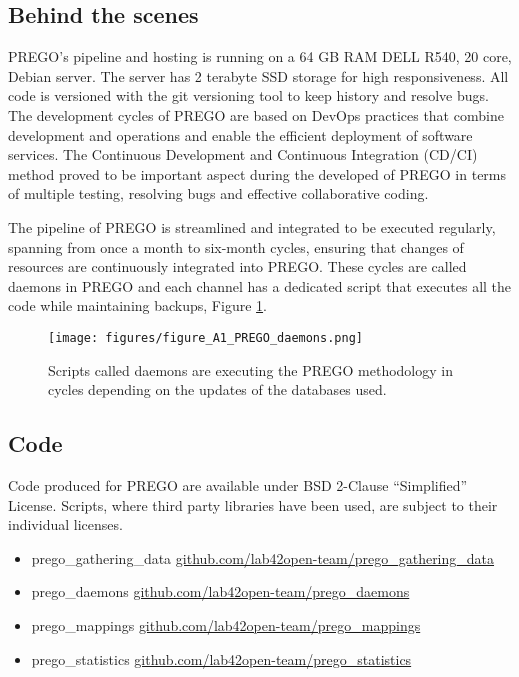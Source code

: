 \subsection{Behind the scenes}
\label{deamons}

PREGO's pipeline and hosting is running on a 64 GB RAM DELL R540, 20 core, Debian server.
The server has 2 terabyte SSD storage for high responsiveness. 
All code is versioned with the git versioning tool to keep history and 
resolve bugs. The development cycles of PREGO are based on DevOps practices that
combine development and operations and enable the efficient deployment of software services.
The Continuous Development and Continuous Integration (CD/CI) method proved to be
important aspect during the developed of PREGO in terms of multiple testing,
resolving bugs and effective collaborative coding. 

The pipeline of PREGO is streamlined and integrated to be executed regularly,
spanning from once a month to six-month cycles, ensuring that changes of resources are
continuously integrated into PREGO. These cycles are called daemons in PREGO and 
each channel has a dedicated script that executes all the code while 
maintaining backups, Figure \ref{fig:devops}.


\begin{figure}[hbt!]
   \centering
   \texttt{[image: figures/figure\_A1\_PREGO\_daemons.png]}
   \caption[PREGO DevOps]{Scripts called daemons are executing the PREGO methodology in cycles depending on the updates of the databases used.}
   \label{fig:devops}
\end{figure}


   \subsection{Code} 
Code produced for PREGO are available under BSD 2-Clause “Simplified” License.
Scripts, where third party libraries have been used, are subject to their individual licenses.
   
   \begin{itemize}
      \item prego\_gathering\_data 
      \href{https://github.com/lab42open-team/prego_gathering_data}{github.com/lab42open-team/prego\_gathering\_data}
      \item prego\_daemons \href{https://github.com/lab42open-team/prego_daemons}{github.com/lab42open-team/prego\_daemons}
      \item prego\_mappings \href{https://github.com/lab42open-team/prego_mappings}{github.com/lab42open-team/prego\_mappings} 
      \item prego\_statistics \href{https://github.com/lab42open-team/prego_statistics}{github.com/lab42open-team/prego\_statistics}
   \end{itemize}

